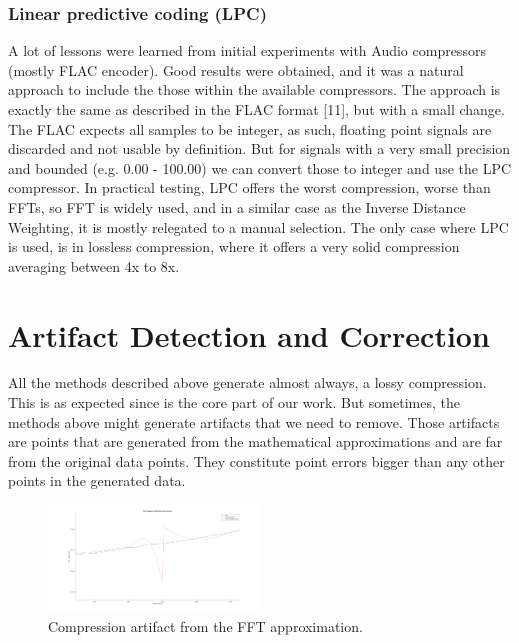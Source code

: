 \documentclass[conference]{IEEEtran}
\begin{document}
\vspace{10pt}
\subsubsection{Linear predictive coding (LPC)}

A lot of lessons were learned from initial experiments with Audio compressors (mostly FLAC encoder).
Good results were obtained, and it was a natural approach to include the those within the available compressors.
The approach is exactly the same as described in the FLAC format [11], but with a small change.
The FLAC expects all samples to be integer, as such, floating point signals are discarded and not usable by definition.
But for signals with a very small precision and bounded (e.g. 0.00 - 100.00) we can convert those to integer and use the LPC compressor.
In practical testing, LPC offers the worst compression, worse than FFTs, so FFT is widely used, and in a similar case as the Inverse Distance Weighting, it is mostly relegated to a manual selection.
The only case where LPC is used, is in lossless compression, where it offers a very solid compression averaging between 4x to 8x.

\vspace{10pt}
\section{Artifact Detection and Correction}

All the methods described above generate almost always, a lossy compression. 
This is as expected since is the core part of our work. 
But sometimes, the methods above might generate artifacts that we need to remove. 
Those artifacts are points that are generated from the mathematical approximations and are far from the original data points.
They constitute point errors bigger than any other points in the generated data.

\begin{figure}[ht]
  \centering
  \includegraphics[width=0.5\textwidth]{compression_artifact.png}
  \caption{Compression artifact from the FFT approximation.}
  \label{fig:artifact}
\end{figure}
\vspace{5pt}
\end{document}

